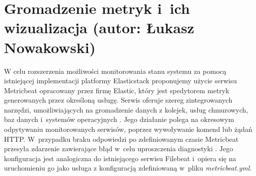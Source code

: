 \section{Gromadzenie metryk i~ich wizualizacja (autor: Łukasz Nowakowski)}
W celu rozszerzenia możliwości monitorowania stanu systemu za pomocą istniejącej implementacji platformy Elasticstack proponujemy użycie serwisu Metricbeat opracowany przez firmę Elastic, który jest spedytorem metryk generowanych przez określoną usługę. Serwis oferuje szereg zintegrowanych narzędzi, umożliwiających na gromadzenie danych z kolejek, usług chmurowych, baz danych i~systemów operacyjnych \cite{metricbeat}. Jego działanie polega na okresowym odpytywaniu monitorowanych serwisów, poprzez wywoływanie komend lub żądań HTTP. W~przypadku braku odpowiedzi po zdefiniowanym czasie Metricbeat przesyła zdarzenie zawierające błąd w~celu uproszczenia diagnostyki \cite{metricbeat_work}. Jego konfiguracja jest analogiczna do istniejącego serwisu Filebeat i~opiera się na uruchomieniu go jako usługa z konfiguracją zdefiniowaną w~pliku \textit{metricbeat.yml}.

